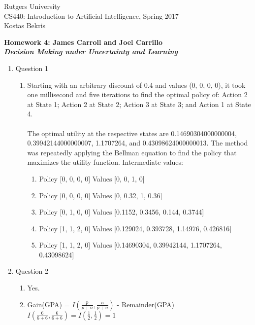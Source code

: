 \documentclass[11pt]{article}
\begin{document}
\sloppy

\noindent Rutgers University\\
CS440: Introduction to Artificial Intelligence, Spring 2017\\
Kostas Bekris\\

\begin{center}
\LARGE{\textbf{Homework 4: James Carroll and Joel Carrillo}}\\
\large{\textbf{\emph{Decision Making under Uncertainty and Learning}}}
\end{center}

\vspace{.1in}

\begin{enumerate}

\item Question 1
\begin{enumerate}
\item Starting with an arbitrary discount of 0.4 and values (0, 0, 0, 0), it took one millisecond and five iterations to find the optimal policy of: Action 2 at State 1; Action 2 at State 2; Action 3 at State 3; and Action 1 at State 4. \\ \\
The optimal utility at the respective states are 0.14690304000000004, 0.39942144000000007, 1.1707264, and 0.43098624000000013. The method was repeatedly applying the Bellman equation to find the policy that maximizes the utility function. Intermediate values:
\begin{enumerate}
\item Policy [0, 0, 0, 0] Values [0, 0, 1, 0]
\item Policy [0, 0, 0, 0] Values [0, 0.32, 1, 0.36]
\item Policy [0, 1, 0, 0] Values [0.1152, 0.3456, 0.144, 0.3744]
\item Policy [1, 1, 2, 0]  Values [0.129024, 0.393728, 1.14976, 0.426816]
\item Policy [1, 1, 2, 0]  Values [0.14690304, 0.39942144, 1.1707264, 0.43098624]
\end{enumerate}
\end{enumerate}
\item Question 2
\begin{enumerate}
\item Yes.
\item Gain(GPA) = $I(\frac{p}{p+n}, \frac{n}{p+n})$ - Remainder(GPA) \\
$I(\frac{6}{6+6}, \frac{6}{6+6}) = I(\frac{1}{2}, \frac{1}{2}) = 1$ \\

\end{enumerate}
\end{enumerate}
\end{document}
